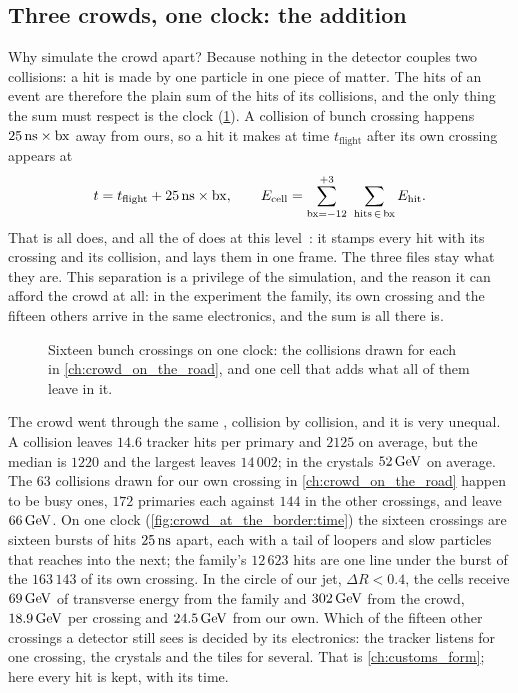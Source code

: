\subsection{Three crowds, one clock: the addition}
\label{sec:crowd_at_the_border:crossing_frame}
\label{sec:crowd_at_the_border:premixing}
\label{sec:crowd_at_the_border:truth}
Why simulate the crowd apart? Because nothing in the detector couples two
collisions: a hit is made by one particle in one piece of matter. The hits
of an event are therefore the plain sum of the hits of its collisions, and
the only thing the sum must respect is the clock
(\cref{fig:crowd_at_the_border:clock}). A collision of bunch crossing \bx
happens $25\,\mathrm{ns}\times\mathrm{bx}$ away from ours, so a hit it makes at time
$t_{\mathrm{flight}}$ after its own crossing appears at
\begin{equation}
  t=t_{\mathrm{flight}}+25\ns\times\bx,\qquad
  E_{\mathrm{cell}}=\sum_{\bx=-12}^{+3}\ \sum_{\mathrm{hits}\,\in\,\bx}E_{\mathrm{hit}} .
  \label{eq:crowd_at_the_border:sum}
\end{equation}
That is all  does, and all the \Mix of \CMSSW does at
this level~\cite{Hildreth:2017caz}: it stamps every hit with its crossing
and its collision, and lays them in one frame. The three files stay what
they are. This separation is a privilege of the simulation, and the reason
it can afford the crowd at all: in the experiment the family, its own
crossing and the fifteen others arrive in the same electronics, and the
sum is all there is.

\begin{figure}[htbp]\centering
\resizebox{0.95\textwidth}{!}{}
\caption[Sixteen crossings on one clock]{Sixteen bunch crossings on one
clock: the collisions drawn for each in \cref{ch:crowd_on_the_road}, and one
cell that adds what all of them leave in it.}
\label{fig:crowd_at_the_border:clock}
\end{figure}

The crowd went through the same \GEANT, collision by collision, and it is
very unequal. A collision leaves $14.6$ tracker hits
per primary and $2125$ on average, but the median
is $1220$ and the largest leaves $14\,002$;
in the crystals $52\,\mathrm{GeV}$ on average. The $63$ collisions drawn for our own
crossing in \cref{ch:crowd_on_the_road} happen to be busy ones, $172$
primaries each against $144$ in the other crossings, and leave $66\,\mathrm{GeV}$. On one clock
(\cref{fig:crowd_at_the_border:time}) the sixteen crossings are sixteen
bursts of hits $25\,\mathrm{ns}$ apart, each with a tail of loopers and slow
particles that reaches into the next; the family's $12\,623$ hits
are one line under the burst of the $163\,143$
of its own crossing. In the circle of our jet, $\Delta R<0.4$, the cells
receive $69\,\mathrm{GeV}$ of
transverse energy from the family and
$302\,\mathrm{GeV}$
from the crowd, $18.9\,\mathrm{GeV}$
per crossing and $24.5\,\mathrm{GeV}$
from our own. Which of the fifteen other crossings a detector still sees is
decided by its electronics: the tracker listens for one crossing, the
crystals and the tiles for several. That is \cref{ch:customs_form}; here
every hit is kept, with its time.

